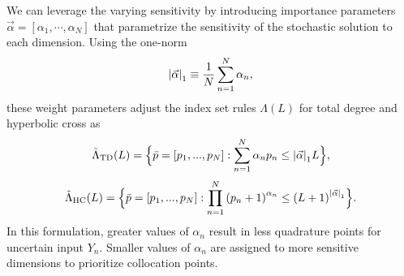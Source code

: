 \documentclass[11pt]{article}
\begin{document}
We can leverage the varying sensitivity by introducing importance parameters $\vec\alpha=[\alpha_1,\cdots,\alpha_N]$ that parametrize the sensitivity of the stochastic solution to each dimension.  Using the one-norm
\begin{equation}
\qty|\vec\alpha|_1\equiv\frac{1}{N}\sum_{n=1}^N \alpha_n,
\end{equation}
these weight parameters adjust the index set rules $\Lambda(L)$ for total degree and hyperbolic cross as
\begin{equation}
\tilde\Lambda_\text{TD}(L)=\Big\{\bar p=[p_1,...,p_N]:\sum_{n=1}^N \alpha_n p_n \leq \qty|\vec\alpha|_1 L \Big\},
\end{equation}
\begin{equation}
\tilde\Lambda_\text{HC}(L)=\Big\{\bar p=[p_1,...,p_N]:\prod_{n=1}^N \qty(p_n+1)^{\alpha_n} \leq \qty(L+1)^{\qty|\vec\alpha|_1} \Big\}.
\end{equation}
In this formulation, greater values of $\alpha_n$ result in less quadrature points for uncertain input $Y_n$.  Smaller values of $\alpha_n$ are assigned to more sensitive dimensions to prioritize collocation points.
\end{document}
